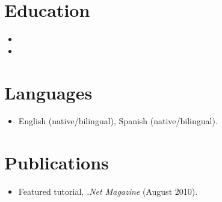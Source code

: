 \documentclass[11pt,a4paper,sans]{moderncv}
\begin{document}

\section{Education}
\vspace{1pt}
\begin{itemize}

\item{}

\vspace{3pt}

\item{}

\end{itemize}


\section{Languages}
\vspace{1pt}
\begin{itemize}
\item English (native/bilingual), Spanish (native/bilingual).
\end{itemize}


\section{Publications}
\vspace{1pt}
\begin{itemize}
\item Featured tutorial, \textit{.Net Magazine} (August 2010).
\end{itemize}

\end{document}
